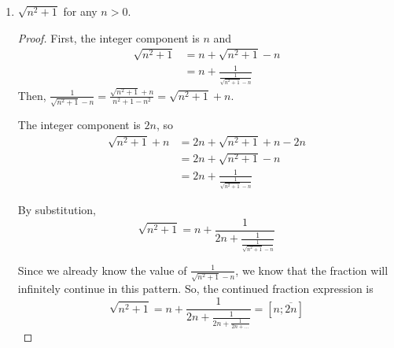 \documentclass[11pt]{article}
\theoremstyle{definition}
\begin{document}
\begin{enumerate}
\begin{enumerate}
\begin{proof}
            Thus, the continued fraction expression is 
            \[
                \frac{5+\sqrt{37}}{2} = 5 + \frac{1}{1 + \frac{1}{1 + \frac{1}{\frac{1}{5 + \frac{1}{1 + \dots}}}}} = [5; \overline{1,1,5}]
            \]

        \end{proof}

        \item $\sqrt{n^2+1}$ for any $n>0$.
        \begin{proof}
            First, the integer component is $n$ and 
            \begin{align*}
                \sqrt{n^2 + 1} &= n + \sqrt{n^2 + 1} - n \\
                &= n + \frac{1}{\frac{1}{\sqrt{n^2 + 1} - n}}
            \end{align*}
            Then, $\frac{1}{\sqrt{n^2 + 1} - n} = \frac{\sqrt{n^2 + 1} + n}{n^2 + 1 - n^2} = \sqrt{n^2 + 1} + n$.

            The integer component is $2n$, so 
            \begin{align*}
                \sqrt{n^2 + 1} + n &= 2n + \sqrt{n^2 + 1} + n - 2n \\
                &= 2n + \sqrt{n^2 + 1} - n \\
                &= 2n + \frac{1}{\frac{1}{\sqrt{n^2 + 1} - n}}
            \end{align*}

            By substitution, 
            \[
                \sqrt{n^2 + 1} = n + \frac{1}{2n + \frac{1}{\frac{1}{\sqrt{n^2 + 1} - n}}}
            \]

            Since we already know the value of $\frac{1}{\sqrt{n^2 + 1} - n}$, 
            we know that the fraction will infinitely continue in this pattern.
            So, the continued fraction expression is 
            \[
                \sqrt{n^2 + 1} = n + \frac{1}{2n + \frac{1}{2n + \frac{1}{2n + \dots}}} = [n; \overline{2n}]
            \]

        \end{proof}


\end{enumerate}
\end{enumerate}
\end{document}
